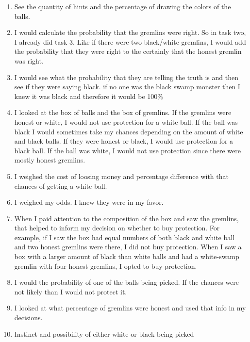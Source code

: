 \documentclass[12pt,a4paper]{article}
\begin{document}
\begin{appendices}
\begin{enumerate}
\item See the quantity of hints and the percentage of drawing the colors of the balls.

\item I would calculate the probability that the gremlins were right. So in task two, I already did task 3. Like if there were two black/white gremlins, I would add the probability that they were right to the certainly that the honest gremlin was right.

\item I would see what the probability that they are telling the truth is and then see if they were saying black. if no one was the black swamp monster then I knew it was black and therefore it would be 100\%

\item I looked at the box of balls and the box of gremlins. If the gremlins were honest or white, I would not use protection for a white ball. If the ball was black I would sometimes take my chances depending on the amount of white and black balls. If they were honest or black, I would use protection for a black ball. If the ball was white, I would not use protection since there were mostly honest gremlins.

\item I weighed the cost of loosing money and percentage difference with that chances of getting a white ball.

\item I weighed my odds. I knew they were in my favor.

\item When I paid attention to the composition of the box and saw the gremlins, that helped to inform my decision on whether to buy protection. For example, if I saw the box had equal numbers of both black and white ball and two honest gremlins were there, I did not buy protection. When I saw a box with a larger amount of black than white balls and had a white-swamp gremlin with four honest gremlins, I opted to buy protection.

\item I would the probability of one of the balls being picked. If the chances were not likely than I would not protect it.

\item I looked at what percentage of gremlins were honest and used that info in my decisions.

\item Instinct and possibility of either white or black being picked


\end{enumerate}
\end{appendices}
\end{document}
